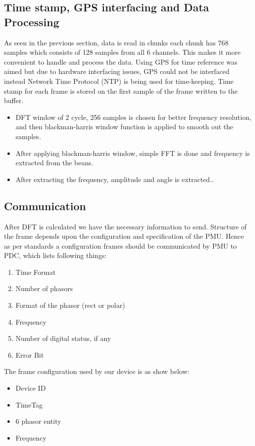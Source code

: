 \subsection{Time stamp, GPS interfacing and Data Processing }
As seen in the previous section, data is read in chunks each chunk has 768 samples which consists of 128 samples from all 6 channels. This makes it more convenient to handle and process the data. Using GPS for time reference was aimed but due to hardware interfacing issues, GPS could not be interfaced instead Network Time Protocol (NTP) is being used for time-keeping. Time stamp for each frame is stored on the first sample of the frame written to the buffer.

\begin{itemize}
	\item DFT window of 2 cycle, 256 samples is chosen for better frequency resolution, and then blackman-harris window function is applied to smooth out the samples.
	\item After applying blackman-harris window, simple FFT is done and frequency is extracted from the beans. 
	\item After extracting the frequency, amplitude and angle is extracted..
\end{itemize} 

\subsection{Communication}

After DFT is calculated we have the necessary information to send. Structure of the frame depends upon the configuration and specification of the PMU. Hence as per standards a configuration frames should be communicated by PMU to PDC, which lists following things:
\begin{enumerate}
	\item Time Format 
	\item Number of phasors
	\item Format of the phasor (rect or polar)
	\item Frequency
	\item Number of digital status, if any
	\item Error Bit
\end{enumerate}

The frame configuration used by our device is as show below:
\begin{itemize}
	\item Device ID
	\item TimeTag 
	\item 6 phasor entity 
	\item Frequency
\end{itemize}

